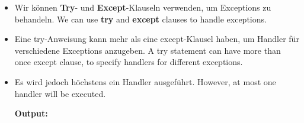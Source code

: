 \documentclass[12pt,c, german, aspectratio=169]{beamer} %
\begin{document}
       \begin{frame}{}
        \begin{itemize}
          \item \trans
          {Wir können \textbf{Try}- und \textbf{Except}-Klauseln verwenden, um Exceptions zu behandeln.}
          {We can use \textbf{try} and \textbf{except} clauses to handle exceptions.}
           \item \trans
           {Eine try-Anweisung kann mehr als eine except-Klausel haben, um Handler für verschiedene Exceptions anzugeben.}
           {A try statement can have more than once except clause, to specify handlers for different exceptions.}
           \item \trans
           {Es wird jedoch höchstens ein Handler ausgeführt.}
           {However, at most one handler will be executed.}
            \\
          \vspace{0.3cm}
          {\footnotesize \textbf{Output:}}
           \\
            \vspace{0.1cm}
        \end{itemize}
      \end{frame}
      
\end{document}
